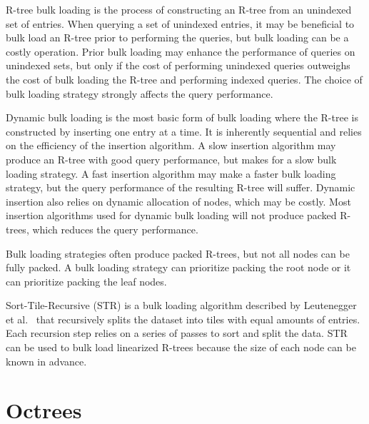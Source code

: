 R-tree bulk loading is the process of constructing an R-tree from an unindexed set of entries. When querying a set of unindexed entries, it may be beneficial to bulk load an R-tree prior to performing the queries, but bulk loading can be a costly operation. Prior bulk loading may enhance the performance of queries on unindexed sets, but only if the cost of performing unindexed queries outweighs the cost of bulk loading the R-tree and performing indexed queries. The choice of bulk loading strategy strongly affects the query performance.

Dynamic bulk loading is the most basic form of bulk loading where the R-tree is constructed by inserting one entry at a time. It is inherently sequential and relies on the efficiency of the insertion algorithm. A slow insertion algorithm may produce an R-tree with good query performance, but makes for a slow bulk loading strategy. A fast insertion algorithm may make a faster bulk loading strategy, but the query performance of the resulting R-tree will suffer. Dynamic insertion also relies on dynamic allocation of nodes, which may be costly. Most insertion algorithms used for dynamic bulk loading will not produce packed R-trees, which reduces the query performance.

Bulk loading strategies often produce packed R-trees, but not all nodes can be fully packed. A bulk loading strategy can prioritize packing the root node or it can prioritize packing the leaf nodes.

Sort-Tile-Recursive (STR) is a bulk loading algorithm described by Leutenegger et al.~\cite{leutenegger1997str} that recursively splits the dataset into tiles with equal amounts of entries. Each recursion step relies on a series of passes to sort and split the data. STR can be used to bulk load linearized R-trees because the size of each node can be known in advance.

\section{Octrees}
